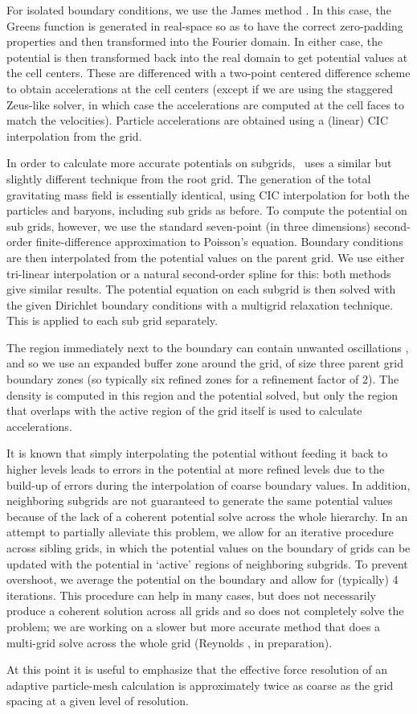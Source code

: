 For isolated boundary conditions, we use the James method \citep{James77}.  In this case, the Greens function is generated in real-space so as to have the correct zero-padding properties and then transformed into the Fourier domain.  In either case, the potential is then transformed back into the real domain to get potential values at the cell centers.  These are differenced with a two-point centered difference scheme to obtain accelerations at the cell centers (except if we are using the staggered Zeus-like solver, in which case the accelerations are computed at the cell faces to match the velocities).  Particle accelerations are obtained using a (linear) CIC interpolation from the grid.

In order to calculate more accurate potentials on subgrids, \enzo\ uses a similar but slightly different technique from the root grid.  The generation of the total gravitating mass field is essentially identical, using CIC interpolation for both the particles and baryons, including sub grids as before.  To compute the potential on sub grids, however, we use the standard seven-point (in three dimensions) second-order finite-difference approximation to Poisson's equation.  Boundary conditions are then interpolated from the potential values on the parent grid.  We use either tri-linear interpolation or a natural second-order spline for this: both methods give similar results. The potential equation on each subgrid is then solved with the given Dirichlet boundary conditions with a multigrid relaxation technique.  This is applied to each sub grid separately.

The region immediately next to the boundary can contain unwanted oscillations \citep[e.g.,][]{Anninos94}, and so we use an expanded buffer zone around the grid, of size three parent grid boundary zones (so typically six refined zones for a refinement factor of 2).  The density is computed in this region and the potential solved, but only the region that overlaps with the active region of the grid itself is used to calculate accelerations.

It is known  that simply interpolating the potential without feeding it back to higher levels leads to errors in the potential at more refined levels due to the build-up of errors during the interpolation of coarse boundary values.  In addition, neighboring subgrids are not guaranteed to generate the same potential values because of the lack of a coherent potential solve across the whole hierarchy. In an attempt to partially alleviate this problem, we allow for an iterative procedure across sibling grids, in which the potential values on the boundary of grids can be updated with the potential in `active' regions of neighboring subgrids.  To prevent overshoot, we average the potential on the boundary and allow for (typically) 4 iterations.  This procedure can help in many cases, but does not necessarily produce a coherent solution across all grids and so does not completely solve the problem; we are working on a slower but more accurate method that does a multi-grid solve across the whole grid (Reynolds \etal, in preparation).

At this point it is useful to emphasize that the effective force resolution of an adaptive particle-mesh calculation is approximately twice as coarse as the grid spacing at a given level of resolution.
